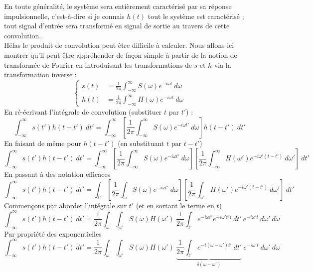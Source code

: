 En toute généralité, le système sera entièrement caractérisé par sa réponse impulsionnelle, c'est-à-dire 
si je connais $h(t)$ tout le système est caractérisé ; tout signal d'entrée sera transformé en 
signal de sortie au travers de cette convolution.\\

Hélas le produit de convolution peut être difficile à calculer. Nous allons ici montrer qu'il peut 
être appréhender de façon simple à partir de la notion de transformée de Fourier en introduisant 
les transformations de $s$ et $h$ via la transformation inverse :
\begin{equation}
\left\{\begin{array}{ll}
s(t) &= \frac{1}{2\pi}\int_{-\infty}^\infty S(\omega)e^{-i\omega t}\ d\omega\\
h(t) &= \frac{1}{2\pi}\int_{-\infty}^\infty H(\omega)e^{-i\omega t}\ d\omega
\end{array}\right.
\end{equation}
En ré-écrivant l'intégrale de convolution (substituer $t$ par $t'$) :
\begin{equation}
\int_{-\infty}^\infty s(t')h(t-t')\ dt' = \int_{-\infty}^\infty \left[\dfrac{1}{2\pi}
\int_{-\infty}^\infty S(\omega)e^{-i\omega t'}\ d\omega\right]h(t-t')\ dt'
\end{equation}
En faisant de même pour $h(t-t')$ (en substituant $t$ par $t-t'$)
\begin{equation}
\int_{-\infty}^\infty s(t')h(t-t')\ dt' = \int_{-\infty}^\infty \left[\dfrac{1}{2\pi}
\int_{-\infty}^\infty S(\omega)e^{-i\omega t'}\ d\omega\right]\left[\frac{1}{2\pi}
\int_{-\infty}^\infty H(\omega')e^{-i\omega'(t-t')}\ d\omega' \right]\ dt'
\end{equation}
En passant à des notation efficaces
\begin{equation}
\int_{-\infty}^\infty s(t')h(t-t')\ dt' = \int_{t'} \left[\dfrac{1}{2\pi}
\int_{\omega} S(\omega)e^{-i\omega t'}\ d\omega\right]\left[\frac{1}{2\pi}
\int_{\omega'} H(\omega')e^{-i\omega'(t-t')}\ d\omega' \right]\ dt'
\end{equation}
Commençons par aborder l'intégrale sur $t'$ (et en sortant le terme en $t$)
\begin{equation}
\int_{-\infty}^\infty s(t')h(t-t')\ dt' = \frac{1}{2\pi}\int_\omega\int_{\omega'}
S(\omega)H(\omega')\ \frac{1}{2\pi}\int_{t'}e^{-i\omega t'}e^{+i\omega't')}\ dt'\ e^{-i
\omega' t}\ d\omega'\ d\omega
\end{equation}
Par propriété des exponentielles
\begin{equation}
\int_{-\infty}^\infty s(t')h(t-t')\ dt' = \frac{1}{2\pi}\int_\omega\int_{\omega'}
S(\omega)H(\omega')\ \underbrace{\frac{1}{2\pi}\int_{t'}e^{-i(\omega-\omega')t'}\ dt'}_{\delta
(\omega-\omega')}\ e^{-i
\omega' t}\ d\omega'\ d\omega
\end{equation}
